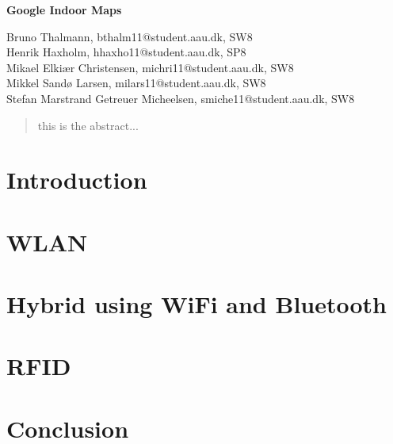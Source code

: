 \documentclass[12pt,a4paper]{article}
\begin{document}
\begin{center}
\bigskip\bigskip
{\Large\bf Google Indoor Maps}
\bigskip\bigskip


Bruno Thalmann, bthalm11@student.aau.dk, SW8\\
Henrik Haxholm, hhaxho11@student.aau.dk, SP8\\
Mikael Elkiær Christensen, michri11@student.aau.dk, SW8\\
Mikkel Sandø Larsen, milars11@student.aau.dk, SW8\\
Stefan Marstrand Getreuer Micheelsen, smiche11@student.aau.dk, SW8

\bigskip
\begin{abstract}
this is the abstract...
\end{abstract}

\thispagestyle{empty}
\end{center}


\titlepage



\thispagestyle{plain}


\section{Introduction}


\section{WLAN}


\section{Hybrid using WiFi and Bluetooth}

\section{RFID}


\section{Conclusion}




\end{document}
